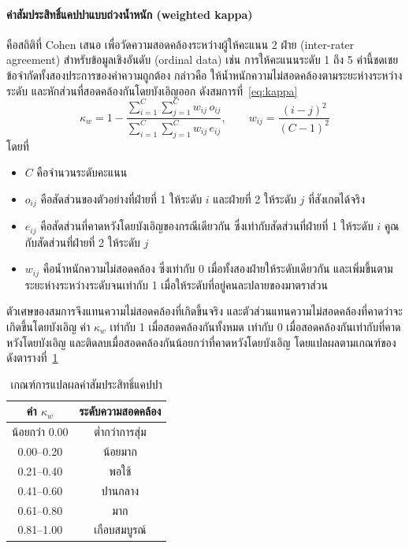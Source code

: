 \paragraph{ค่าสัมประสิทธิ์แคปปาแบบถ่วงน้ำหนัก (weighted kappa)}
คือสถิติที่ Cohen เสนอ \citep{Cohen1968} เพื่อวัดความสอดคล้องระหว่างผู้ให้คะแนน 2 ฝ่าย (inter-rater agreement)
สำหรับข้อมูลเชิงอันดับ (ordinal data) เช่น การให้คะแนนระดับ 1 ถึง 5 ค่านี้ชดเชยข้อจำกัดทั้งสองประการของค่าความถูกต้อง
กล่าวคือ ให้น้ำหนักความไม่สอดคล้องตามระยะห่างระหว่างระดับ และหักส่วนที่สอดคล้องกันโดยบังเอิญออก ดังสมการที่~\eqref{eq:kappa}
\begin{equation}
\kappa_w = 1 - \frac{\sum_{i=1}^{C}\sum_{j=1}^{C} w_{ij}\, o_{ij}}{\sum_{i=1}^{C}\sum_{j=1}^{C} w_{ij}\, e_{ij}}, \qquad w_{ij} = \frac{(i-j)^2}{(C-1)^2}
\label{eq:kappa}
\end{equation}
โดยที่
\begin{itemize}[nosep, before=\vspace{-0.5\parskip}]
    \item $C$ คือจำนวนระดับคะแนน
    \item $o_{ij}$ คือสัดส่วนของตัวอย่างที่ฝ่ายที่ 1 ให้ระดับ $i$ และฝ่ายที่ 2 ให้ระดับ $j$ ที่สังเกตได้จริง
    \item $e_{ij}$ คือสัดส่วนที่คาดหวังโดยบังเอิญของกรณีเดียวกัน ซึ่งเท่ากับสัดส่วนที่ฝ่ายที่ 1 ให้ระดับ $i$ คูณกับสัดส่วนที่ฝ่ายที่ 2 ให้ระดับ $j$
    \item $w_{ij}$ คือน้ำหนักความไม่สอดคล้อง ซึ่งเท่ากับ 0 เมื่อทั้งสองฝ่ายให้ระดับเดียวกัน และเพิ่มขึ้นตามระยะห่างระหว่างระดับจนเท่ากับ 1 เมื่อให้ระดับที่อยู่คนละปลายของมาตราส่วน
\end{itemize}
\vspace{-\parskip}
ตัวเศษของสมการจึงแทนความไม่สอดคล้องที่เกิดขึ้นจริง และตัวส่วนแทนความไม่สอดคล้องที่คาดว่าจะเกิดขึ้นโดยบังเอิญ
ค่า $\kappa_w$ เท่ากับ 1 เมื่อสอดคล้องกันทั้งหมด เท่ากับ 0 เมื่อสอดคล้องกันเท่ากับที่คาดหวังโดยบังเอิญ
และติดลบเมื่อสอดคล้องกันน้อยกว่าที่คาดหวังโดยบังเอิญ โดยแปลผลตามเกณฑ์ของ \citet{Landis1977} ดังตารางที่~\ref{tab:kappa-interp}

\begin{table}[htbp]
\centering
\begin{tabular}{cc}
\hline
\textbf{ค่า $\kappa_w$} & \textbf{ระดับความสอดคล้อง} \\
\hline
น้อยกว่า 0.00 & ต่ำกว่าการสุ่ม \\
0.00--0.20 & น้อยมาก \\
0.21--0.40 & พอใช้ \\
0.41--0.60 & ปานกลาง \\
0.61--0.80 & มาก \\
0.81--1.00 & เกือบสมบูรณ์ \\
\hline
\end{tabular}
\caption{เกณฑ์การแปลผลค่าสัมประสิทธิ์แคปปา \citep{Landis1977}}
\label{tab:kappa-interp}
\end{table}

